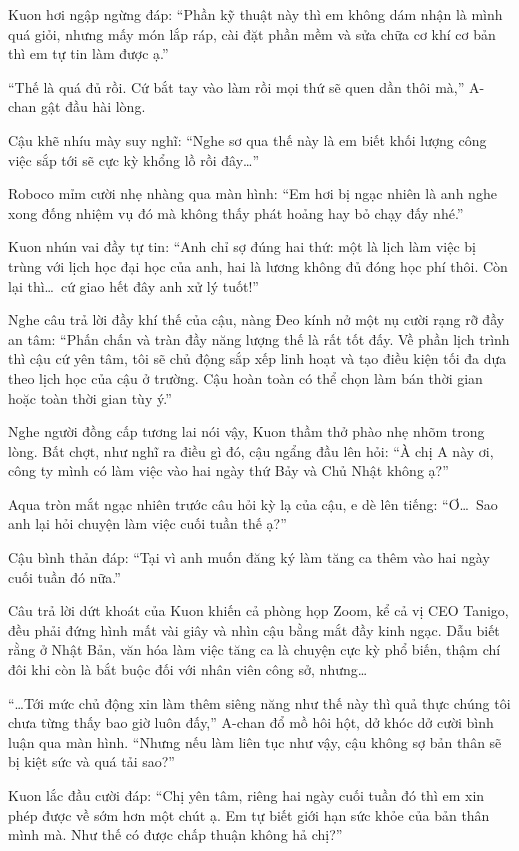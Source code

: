 \documentclass[../main.tex]{subfiles}
\begin{document}
Kuon hơi ngập ngừng đáp: ``Phần kỹ thuật này thì em không dám nhận là mình quá giỏi, nhưng mấy món lắp ráp, cài đặt phần mềm và sửa chữa cơ khí cơ bản thì em tự tin làm được ạ.''

``Thế là quá đủ rồi. Cứ bắt tay vào làm rồi mọi thứ sẽ quen dần thôi mà,'' A-chan gật đầu hài lòng.

Cậu khẽ nhíu mày suy nghĩ: ``Nghe sơ qua thế này là em biết khối lượng công việc sắp tới sẽ cực kỳ khổng lồ rồi đây\dots''

Roboco mỉm cười nhẹ nhàng qua màn hình: ``Em hơi bị ngạc nhiên là anh nghe xong đống nhiệm vụ đó mà không thấy phát hoảng hay bỏ chạy đấy nhé.''

Kuon nhún vai đầy tự tin: ``Anh chỉ sợ đúng hai thứ: một là lịch làm việc bị trùng với lịch học đại học của anh, hai là lương không đủ đóng học phí thôi. Còn lại thì\dots\ cứ giao hết đây anh xử lý tuốt!''

Nghe câu trả lời đầy khí thế của cậu, nàng Đeo kính nở một nụ cười rạng rỡ đầy an tâm: ``Phấn chấn và tràn đầy năng lượng thế là rất tốt đấy. Về phần lịch trình thì cậu cứ yên tâm, tôi sẽ chủ động sắp xếp linh hoạt và tạo điều kiện tối đa dựa theo lịch học của cậu ở trường. Cậu hoàn toàn có thể chọn làm bán thời gian hoặc toàn thời gian tùy ý.''

Nghe người đồng cấp tương lai nói vậy, Kuon thầm thở phào nhẹ nhõm trong lòng. Bất chợt, như nghĩ ra điều gì đó, cậu ngẩng đầu lên hỏi: ``À chị A này ơi, công ty mình có làm việc vào hai ngày thứ Bảy và Chủ Nhật không ạ?''

Aqua tròn mắt ngạc nhiên trước câu hỏi kỳ lạ của cậu, e dè lên tiếng: ``Ơ\dots\ Sao anh lại hỏi chuyện làm việc cuối tuần thế ạ?''

Cậu bình thản đáp: ``Tại vì anh muốn đăng ký làm tăng ca thêm vào hai ngày cuối tuần đó nữa.''

Câu trả lời dứt khoát của Kuon khiến cả phòng họp Zoom, kể cả vị CEO Tanigo, đều phải đứng hình mất vài giây và nhìn cậu bằng mắt đầy kinh ngạc. Dẫu biết rằng ở Nhật Bản, văn hóa làm việc tăng ca là chuyện cực kỳ phổ biến, thậm chí đôi khi còn là bắt buộc đối với nhân viên công sở, nhưng\dots

``\dots Tới mức chủ động xin làm thêm siêng năng như thế này thì quả thực chúng tôi chưa từng thấy bao giờ luôn đấy,'' A-chan đổ mồ hôi hột, dở khóc dở cười bình luận qua màn hình. ``Nhưng nếu làm liên tục như vậy, cậu không sợ bản thân sẽ bị kiệt sức và quá tải sao?''

Kuon lắc đầu cười đáp: ``Chị yên tâm, riêng hai ngày cuối tuần đó thì em xin phép được về sớm hơn một chút ạ. Em tự biết giới hạn sức khỏe của bản thân mình mà. Như thế có được chấp thuận không hả chị?''
\end{document}
